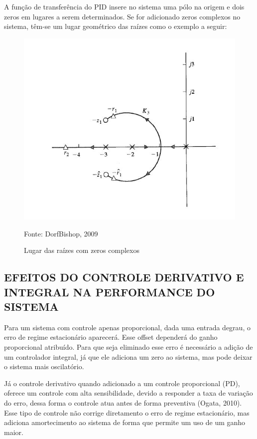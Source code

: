 \documentclass[a4paper,12pt]{article}
\begin{document}
A função de transferência do PID insere no sistema uma pólo na origem e dois zeros em lugares a serem determinados. Se for adicionado zeros complexos no sistema, têm-se um lugar geométrico das raízes como o exemplo a seguir: 

\begin{figure}[!h]
\centering
\includegraphics[scale=1]{lugar-das-raizes-pid.jpg}
\caption{Lugar das raízes com zeros complexos}
\label{fig:lgr}
{Fonte: DorfBishop, 2009}
\end{figure}


\subsection{EFEITOS DO CONTROLE DERIVATIVO E INTEGRAL NA PERFORMANCE DO SISTEMA}
\hspace{4ex}
Para um sistema com controle apenas proporcional, dada uma entrada degrau, o erro de regime estacionário aparecerá. Esse offset dependerá do ganho proporcional atribuído. Para que seja eliminado esse erro é necessário a adição de um controlador integral, já que ele adiciona um zero ao sistema, mas pode deixar o sistema mais oscilatório.

Já o controle derivativo quando adicionado a um controle proporcional (PD), oferece um controle com alta sensibilidade, devido a responder a taxa de variação do erro, dessa forma o controle atua antes de forma preventiva (Ogata, 2010). Esse tipo de controle não corrige diretamento o erro de regime estacionário, mas adiciona amortecimento ao sistema de forma que permite um uso de um ganho maior.
\end{document}
